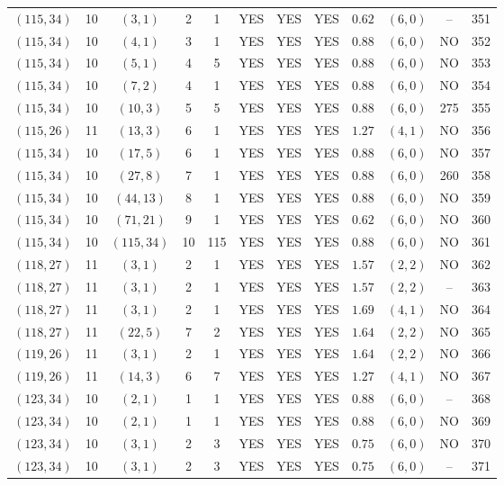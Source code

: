 \begin{longtable}{|c|c|c|c|c|c|c|c|c|c|c|c|}
$(115,34)$ & 10 & $(3,1)$ & 2 & 1 & YES & YES & YES & $0.62$ & $(6,0)$ & -- & 351\\
$(115,34)$ & 10 & $(4,1)$ & 3 & 1 & YES & YES & YES & $0.88$ & $(6,0)$ & NO & 352\\
$(115,34)$ & 10 & $(5,1)$ & 4 & 5 & YES & YES & YES & $0.88$ & $(6,0)$ & NO & 353\\
$(115,34)$ & 10 & $(7,2)$ & 4 & 1 & YES & YES & YES & $0.88$ & $(6,0)$ & NO & 354\\
$(115,34)$ & 10 & $(10,3)$ & 5 & 5 & YES & YES & YES & $0.88$ & $(6,0)$ & 275 & 355\\
$(115,26)$ & 11 & $(13,3)$ & 6 & 1 & YES & YES & YES & $1.27$ & $(4,1)$ & NO & 356\\
$(115,34)$ & 10 & $(17,5)$ & 6 & 1 & YES & YES & YES & $0.88$ & $(6,0)$ & NO & 357\\
$(115,34)$ & 10 & $(27,8)$ & 7 & 1 & YES & YES & YES & $0.88$ & $(6,0)$ & 260 & 358\\
$(115,34)$ & 10 & $(44,13)$ & 8 & 1 & YES & YES & YES & $0.88$ & $(6,0)$ & NO & 359\\
$(115,34)$ & 10 & $(71,21)$ & 9 & 1 & YES & YES & YES & $0.62$ & $(6,0)$ & NO & 360\\
$(115,34)$ & 10 & $(115,34)$ & 10 & 115 & YES & YES & YES & $0.88$ & $(6,0)$ & NO & 361\\
$(118,27)$ & 11 & $(3,1)$ & 2 & 1 & YES & YES & YES & $1.57$ & $(2,2)$ & NO & 362\\
$(118,27)$ & 11 & $(3,1)$ & 2 & 1 & YES & YES & YES & $1.57$ & $(2,2)$ & -- & 363\\
$(118,27)$ & 11 & $(3,1)$ & 2 & 1 & YES & YES & YES & $1.69$ & $(4,1)$ & NO & 364\\
$(118,27)$ & 11 & $(22,5)$ & 7 & 2 & YES & YES & YES & $1.64$ & $(2,2)$ & NO & 365\\
$(119,26)$ & 11 & $(3,1)$ & 2 & 1 & YES & YES & YES & $1.64$ & $(2,2)$ & NO & 366\\
$(119,26)$ & 11 & $(14,3)$ & 6 & 7 & YES & YES & YES & $1.27$ & $(4,1)$ & NO & 367\\
$(123,34)$ & 10 & $(2,1)$ & 1 & 1 & YES & YES & YES & $0.88$ & $(6,0)$ & -- & 368\\
$(123,34)$ & 10 & $(2,1)$ & 1 & 1 & YES & YES & YES & $0.88$ & $(6,0)$ & NO & 369\\
$(123,34)$ & 10 & $(3,1)$ & 2 & 3 & YES & YES & YES & $0.75$ & $(6,0)$ & NO & 370\\
$(123,34)$ & 10 & $(3,1)$ & 2 & 3 & YES & YES & YES & $0.75$ & $(6,0)$ & -- & 371\\

\end{longtable}
